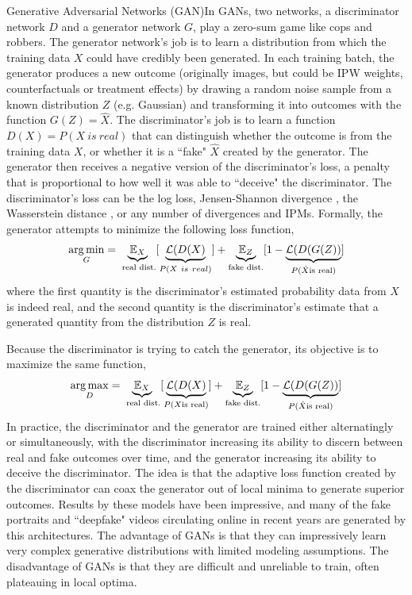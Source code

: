 \begin{TCBBox}[label=box:gan]{Generative Adversarial Networks (GAN)}In GANs, two networks, a discriminator network $D$ and a generator network $G$, play a zero-sum game like cops and robbers. The generator network's job is to learn a distribution from which the training data $X$ could have credibly been generated. In each training batch, the generator produces a new outcome (originally images, but could be IPW weights, counterfactuals or treatment effects) by drawing a random noise sample from a known distribution $Z$ (e.g. Gaussian) and transforming it into outcomes with the function $G(Z)=\hat{X}$. The discriminator's job is to learn a function $D(X)=P(X\ is\ real)$ that can distinguish whether the outcome is from the training data $X$, or whether it is a ``fake" $\hat{X}$ created by the generator. The generator then receives a negative version of the discriminator's loss, a penalty that is proportional to how well it was able to ``deceive" the discriminator.  The discriminator's loss can be the log loss,  Jensen-Shannon divergence \citep{goodfellow2014generative}, the Wasserstein distance \citep{arjovsky2017wasserstein, gulrajani2017improved}, or any number of divergences and IPMs. Formally, the generator attempts to minimize the following loss function,
\begin{equation*}
\operatorname*{arg\,min}_{G}=\underbrace{\mathbb{E}_{X}}_{\text{ real dist.}}[\underbrace{\mathcal{L}(D(X)}_{P(X\ is\ real)}] + \underbrace{\mathbb{E}_{Z}}_{\text{fake dist.}}[1-\underbrace{\mathcal{L}(D(G(Z))}_{P(\hat{X}\text{is real})}]
\end{equation*}
where the first quantity is the discriminator's estimated probability data from $X$ is indeed real, and the second quantity is the discriminator's estimate that a generated quantity from the distribution $Z$ is real. 

Because the discriminator is trying to catch the generator, its objective is to maximize the same function,
\begin{equation*}
\operatorname*{arg\,max}_{D}=\underbrace{\mathbb{E}_{X}}_{\text{ real dist.}}[\underbrace{\mathcal{L}(D(X)}_{P(X \text{is real})}] + \underbrace{\mathbb{E}_{Z}}_{\text{fake dist.}}[1-\underbrace{\mathcal{L}(D(G(Z))}_{P(\hat{X}\text{is real})}]
\end{equation*}
In practice, the discriminator and the generator are trained either alternatingly or simultaneously, with the discriminator increasing its ability to discern between real and fake outcomes over time, and the generator increasing its ability to deceive the discriminator. The idea is that the adaptive loss function created by the discriminator can coax the generator out of local minima to generate superior outcomes. Results by these models have been impressive, and many of the fake portraits and ``deepfake" videos circulating online in recent years are generated by this architectures. The advantage of GANs is that they can impressively learn very complex generative distributions with limited modeling assumptions. The disadvantage of GANs is that they are difficult and unreliable to train, often plateauing in local optima.
\end{TCBBox}
\label{Box:GANs}

